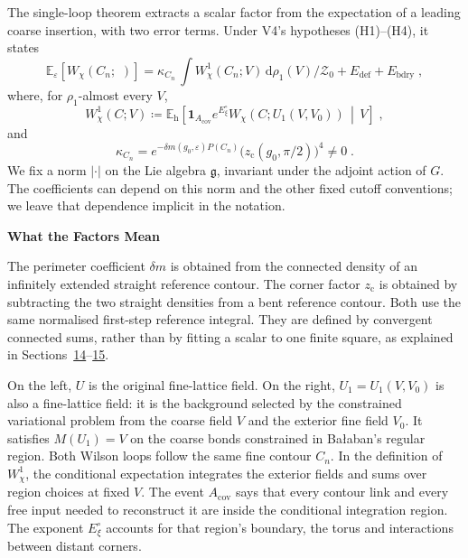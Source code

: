 \documentclass[11pt,a4paper]{article}
\makeatletter
\newcommand{\dd}{\mathrm{d}}
\newcommand{\id}{\mathbf 1}
\newcommand{\Eh}{\mathbb E_{\mathrm h}}
\newcommand*{\bigcdot}{}%
\DeclareRobustCommand*{\bigcdot}{%
  \mathbin{\mathpalette\bigcdot@{}}%
}
\newcommand*{\bigcdot@scalefactor}{.7}
\newcommand*{\bigcdot@widthfactor}{1.15}
\newcommand*{\bigcdot@}[2]{%
  \sbox0{$#1\vcenter{}$}%
  \sbox2{$#1\cdot\m@th$}%
  \hbox to \bigcdot@widthfactor\wd2{%
    \hfil
    \raise\ht0\hbox{%
      \scalebox{\bigcdot@scalefactor}{%
        \lower\ht0\hbox{$#1\bullet\m@th$}%
      }%
    }%
    \hfil
  }%
}
\newcommand{\subhead}[1]{\par\vspace{4pt}\textbf{\color{ink}#1}\par}
\makeatother
\begin{document}
The single-loop theorem extracts a scalar factor from the expectation of a leading coarse insertion, with two error terms. Under V4's hypotheses (H1)--(H4), it states
\begin{equation*}
        \mathbb E_\varepsilon[W_\chi(C_n; \, \bigcdot \, )] =\kappa_{C_n}\, \int W^1_{\chi}(C_n;V) \, \dd \rho_1(V)/\mathcal Z_0  +E_{\mathrm{def}}+E_{\mathrm{bdry}}\;,
\end{equation*}
where, for $\rho_1$-almost every $V$,
\begin{equation*}
    W^1_{\chi}(C;V)\coloneqq \Eh\!\left[\id_{A_{\mathrm{cov}}}
        e^{E^\circ_\xi}W_\chi(C;U_1(V,V_0))
        \,\middle|\,V\right]\;,
\end{equation*}
and
\begin{equation*}
    \kappa_{C_n}
        =e^{-\delta m(g_0,\varepsilon)P(C_n)}
            \bigl(z_{\mathrm c}(g_0,\pi/2)\bigr)^4
        \neq 0\;.
\end{equation*}
We fix a norm $|\cdot|$ on the Lie algebra $\mathfrak g$, invariant under the adjoint action of $G$. The coefficients can depend on this norm and the other fixed cutoff conventions; we leave that dependence implicit in the notation.

\subhead{What the Factors Mean}
The perimeter coefficient $\delta m$ is obtained from the connected density of an infinitely extended straight reference contour. The corner factor $z_{\mathrm c}$ is obtained by subtracting the two straight densities from a bent reference contour. Both use the same normalised first-step reference integral. They are defined by convergent connected sums, rather than by fitting a scalar to one finite square, as explained in Sections~\hyperref[summary:14]{14}--\hyperref[summary:15]{15}.

On the left, $U$ is the original fine-lattice field. On the right, $U_1=U_1(V,V_0)$ is also a fine-lattice field: it is the background selected by the constrained variational problem from the coarse field $V$ and the exterior fine field $V_0$. It satisfies $M(U_1)=V$ on the coarse bonds constrained in Ba{\l}aban's regular region. Both Wilson loops follow the same fine contour $C_n$. In the definition of $W^1_\chi$, the conditional expectation integrates the exterior fields and sums over region choices at fixed $V$. The event $A_{\mathrm{cov}}$ says that every contour link and every free input needed to reconstruct it are inside the conditional integration region. The exponent $E^\circ_\xi$ accounts for that region's boundary, the torus and interactions between distant corners.
\end{document}
